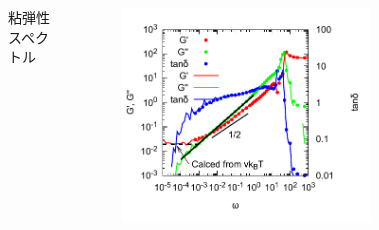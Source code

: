 \documentclass[11pt, dvipdfmx]{beamer}
\begin{document}
\begin{frame}
\begin{columns}[totalwidth=1\textwidth]
\begin{figure}
\end{figure}
\scriptsize
粘弾性スペクトル
\vspace{-2mm}
\begin{figure}
\centering
\includegraphics[width=\textwidth]{./fig/N_44_Freq_Sweep.pdf}
\end{figure}
\end{columns}
\end{frame}
\end{document}
